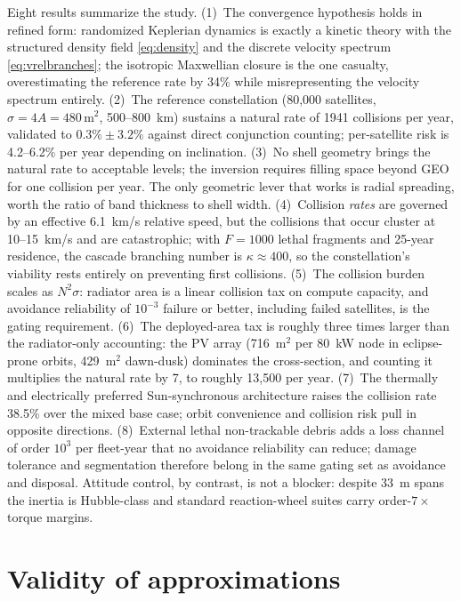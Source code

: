 \documentclass[11pt,a4paper]{article}
\begin{document}
Eight results summarize the study. (1)~The convergence hypothesis holds in refined form:
randomized Keplerian dynamics is exactly a kinetic theory with the structured density
field \eqref{eq:density} and the discrete velocity spectrum \eqref{eq:vrelbranches};
the isotropic Maxwellian closure is the one casualty, overestimating the reference rate
by 34\% while misrepresenting the velocity spectrum entirely. (2)~The reference
constellation (80{,}000 satellites, $\sigma = 4A = 480\,\mathrm{m}^2$, 500--800~km)
sustains a natural rate of 1941 collisions per year, validated to $0.3\% \pm 3.2\%$
against direct conjunction counting; per-satellite risk is 4.2--6.2\% per year depending
on inclination. (3)~No shell geometry brings the natural rate to acceptable levels; the
inversion requires filling space beyond GEO for one collision per year. The only
geometric lever that works is radial spreading, worth the ratio of band thickness to
shell width. (4)~Collision \emph{rates} are governed by an effective 6.1~km/s relative
speed, but the collisions that occur cluster at 10--15~km/s and are catastrophic; with
$F = 1000$ lethal fragments and 25-year residence, the cascade branching number is
$\kappa \approx 400$, so the constellation's viability rests entirely on preventing
first collisions. (5)~The collision burden scales as $N^2 \sigma$: radiator area is a
linear collision tax on compute capacity, and avoidance reliability of $10^{-3}$
failure or better, including failed satellites, is the gating requirement.
(6)~The deployed-area tax is roughly three times larger than the radiator-only
accounting: the PV array (716~$\mathrm{m}^2$ per 80~kW node in eclipse-prone
orbits, 429~$\mathrm{m}^2$ dawn-dusk) dominates the cross-section, and counting it
multiplies the natural rate by 7, to roughly 13{,}500 per year. (7)~The
thermally and electrically preferred Sun-synchronous architecture raises the
collision rate 38.5\% over the mixed base case; orbit convenience and collision
risk pull in opposite directions. (8)~External lethal non-trackable debris adds a
loss channel of order $10^3$ per fleet-year that no avoidance reliability can
reduce; damage tolerance and segmentation therefore belong in the same gating set
as avoidance and disposal. Attitude control, by contrast, is not a blocker:
despite 33~m spans the inertia is Hubble-class and standard reaction-wheel suites
carry order-$7\times$ torque margins.

\section{Validity of approximations}
\end{document}
